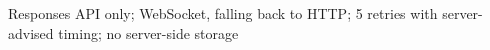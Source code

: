 Responses API only; WebSocket, falling back to HTTP; 5 retries with server-advised timing; no server-side storage
